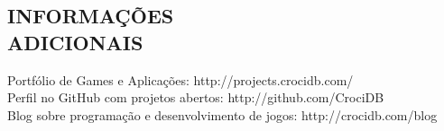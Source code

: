 \documentclass[line,margin]{res}
\begin{document}
\begin{resume}
\section{INFORMAÇÕES \\ ADICIONAIS}             
            Portfólio de Games e Aplicações: http://projects.crocidb.com/ \\
            Perfil no GitHub com projetos abertos: http://github.com/CrociDB \\
            Blog sobre programação e desenvolvimento de jogos: http://crocidb.com/blog
 

\end{resume}
\end{document}
